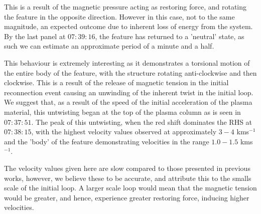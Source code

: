 \documentclass{emulateapj}
\begin{document}
This is a result of the magnetic pressure acting as restoring force, and rotating the feature in the opposite direction. 
However in this case, not to the same magnitude, an expected outcome due to inherent loss of energy from the system.
By the last panel at $07:39:16$, the feature has returned to a 'neutral' state, as such we can estimate an approximate period of a minute and a half.

This behaviour is extremely interesting as it demonstrates a torsional motion of the entire body of the feature, with the structure rotating anti-clockwise and then clockwise.
This is a result of the release of magnetic tension in the initial reconnection event causing an unwinding of the inherent twist in the initial loop.
We suggest that, as a result of the speed of the initial acceleration of the plasma material, this untwisting began at the top of the plasma column as is seen in $07:37:51$.
The peak of this untwisting, when the red shift dominates the RHS at $07:38:15$, with the highest velocity values observed at approximately $3-4$ kms${^{-1}}$ and the 'body' of the feature demonstrating velocities in the range $1.0-1.5$ kms${^{-1}}$.

The velocity values given here are slow compared to those presented in previous works, however, we believe these to be accurate, and attribute this to the smalls scale of the initial loop.
A larger scale loop would mean that the magnetic tension would be greater, and hence, experience greater restoring force, inducing higher velocities.

  
\end{document}
